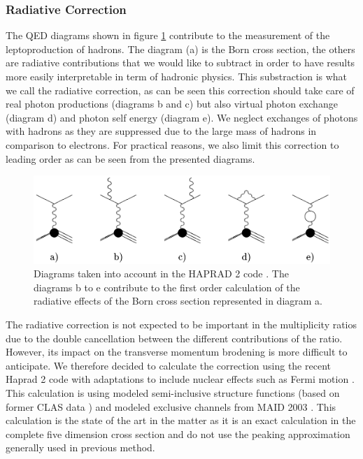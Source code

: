 \subsubsection{Radiative Correction}
\label{RadCor}

The QED diagrams shown in figure \ref{fig:FDRadCorr} contribute to the measurement
of the leptoproduction of hadrons. The diagram (a) is the Born cross section, the
others are radiative contributions that we would like to subtract in order to 
have results more easily interpretable in term of hadronic physics.
This substraction is what we call the radiative correction, as can be seen 
this correction should take care of real photon productions (diagrams b and c)
but also virtual photon exchange (diagram d) and photon self energy (diagram e).
We neglect exchanges of photons with hadrons as they are suppressed due to the 
large mass of hadrons in comparison to electrons. For practical reasons, we also 
limit this correction to leading order as can be seen from the presented diagrams.

\begin{figure}[htp]
\centering
\includegraphics[width=12cm] {chap5-fig/RadDiag.png}
\caption {Diagrams taken into account in the HAPRAD 2 code \cite{Akushevich:2007jc}. The 
diagrams b to e contribute to the first order calculation of the radiative 
effects of the Born cross section represented in diagram a.}
\label{fig:FDRadCorr}
\end{figure}

The radiative correction is not expected to be important in the multiplicity 
ratios due to the double cancellation between the different contributions of 
the ratio. However, its impact on the transverse momentum brodening is more 
difficult to anticipate. We therefore decided to calculate the correction using 
the recent Haprad 2 code \cite{Akushevich:2007jc} with adaptations to include
nuclear effects such as Fermi motion \cite{Osipenko:PC}. This calculation is
using modeled semi-inclusive structure functions (based on former CLAS
data \cite{Akushevich:2007jc}) and modeled exclusive channels from MAID 2003
\cite{Drechsel:1998hk}. This calculation is the state of the art in the matter
as it is an exact calculation in the complete five dimension cross section
and do not use the peaking approximation generally used in previous method.

